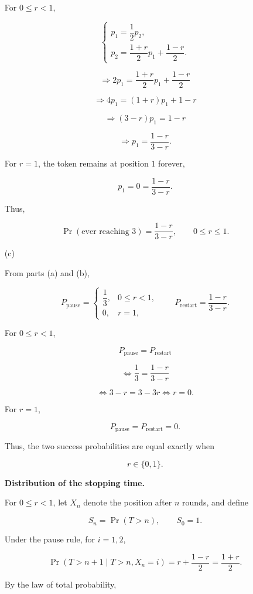 \documentclass[11pt,a4paper]{article}
\begin{document}
\begin{enumerate}
For $0\le r<1$,

\[
\begin{cases}
p_1=\dfrac12p_2,\\[8pt]
p_2=\dfrac{1+r}{2}p_1+\dfrac{1-r}{2}.
\end{cases}
\]

\[
\Rightarrow
2p_1=\frac{1+r}{2}p_1+\frac{1-r}{2}
\]

\[
\Rightarrow
4p_1=(1+r)p_1+1-r
\]

\[
\Rightarrow
(3-r)p_1=1-r
\]

\[
\Rightarrow
p_1=\frac{1-r}{3-r}.
\]

For $r=1$, the token remains at position $1$ forever,

\[
p_1=0=\frac{1-r}{3-r}.
\]

Thus,

\[
\Pr(\text{ever reaching }3)
=\frac{1-r}{3-r},
\qquad 0\le r\le1.
\]

\item[(c)]

From parts (a) and (b),

\[
P_{\mathrm{pause}}=
\begin{cases}
\dfrac13, & 0\le r<1,\\[6pt]
0, & r=1,
\end{cases}
\qquad
P_{\mathrm{restart}}=\frac{1-r}{3-r}.
\]

For $0\le r<1$,

\[
P_{\mathrm{pause}}=P_{\mathrm{restart}}
\]

\[
\Leftrightarrow
\frac13=\frac{1-r}{3-r}
\]

\[
\Leftrightarrow
3-r=3-3r
\Leftrightarrow r=0.
\]

For $r=1$,

\[
P_{\mathrm{pause}}=P_{\mathrm{restart}}=0.
\]

Thus, the two success probabilities are equal exactly when

\[
r\in\{0,1\}.
\]

\medskip
\noindent
\textbf{Distribution of the stopping time.}

For $0\le r<1$, let $X_n$ denote the position after
$n$ rounds, and define

\[
S_n=\Pr(T>n),\qquad S_0=1.
\]

Under the pause rule, for $i=1,2$,

\[
\Pr(T>n+1\mid T>n,X_n=i)
=r+\frac{1-r}{2}
=\frac{1+r}{2}.
\]

By the law of total probability,


\end{enumerate}
\end{document}
